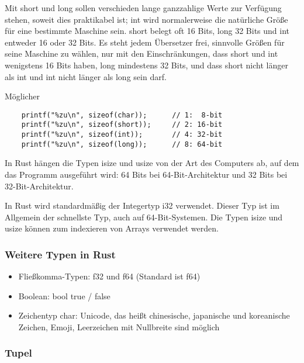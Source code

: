 Mit \glqq short\grqq{} und \glqq long\grqq{} sollen verschieden lange ganzzahlige Werte zur Ver\-fü\-gung stehen, soweit dies praktikabel ist; \glqq int\grqq{} wird normalerweise die natürliche Größe für eine bestimmte Maschine sein. \glqq short\grqq{} belegt oft 16 Bits, \glqq long\grqq{} 32 Bits und \glqq int\grqq{} entweder 16 oder 32 Bits. Es steht jedem Übersetzer frei, sinnvolle Größen für seine Maschine zu wählen, nur mit den Einschränkungen, dass \glqq short\grqq{} und \glqq int\grqq{} wenigstens 16 Bits haben, \glqq long\grqq{} mindestens 32 Bits, und dass \glqq short\grqq{} nicht länger als \glqq int\grqq{} und \glqq int\grqq{} nicht länger als \glqq long\grqq{} sein darf.

Möglicher

\begin{lstlisting}
    printf("%zu\n", sizeof(char));      // 1:  8-bit
    printf("%zu\n", sizeof(short));     // 2: 16-bit
    printf("%zu\n", sizeof(int));       // 4: 32-bit
    printf("%zu\n", sizeof(long));      // 8: 64-bit
\end{lstlisting}

In Rust hängen die Typen \glqq isize\grqq{} und \glqq usize\grqq{} von der Art des Computers ab, auf dem das Programm ausgeführt wird: 64 Bits bei 64-Bit-Architektur und 32 Bits bei 32-Bit-Architektur.

In Rust wird standardmäßig der Integertyp i32 verwendet. Dieser Typ ist im Allgemein der schnellste Typ, auch auf 64-Bit-Systemen. Die Typen \glqq isize\grqq{} und \glqq usize\grqq{} können zum indexieren von Arrays verwendet werden.

\subsubsection{Weitere Typen in Rust}

\begin{itemize}
    \item Fließkomma-Typen: \glqq f32\grqq{} und \glqq f64\grqq{} (Standard ist \glqq f64\grqq{})
    \item Boolean: \glqq bool\grqq{} true / false
    \item Zeichentyp \glqq char\grqq{}: Unicode, das heißt chinesische, japanische und koreanische Zeichen, Emoji, Leerzeichen mit Nullbreite sind möglich
\end{itemize}

\subsubsection{Tupel}

